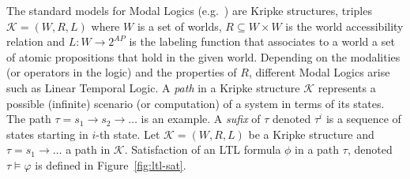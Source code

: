 \documentclass{llncs}%
\begin{document}
The standard models for Modal Logics (e.g.~\cite{goldblatt}) are Kripke structures, triples $\mathcal{K} = (W, R, L)$ where $W$ is a set of worlds, $R \subseteq W \times W$ is the world accessibility relation and $L : W \to 2^{\mathit{AP}}$ is the labeling function that associates to a world a set of atomic propositions that hold in the given world. Depending on the modalities (or operators in the logic) and the properties of $R$, different Modal Logics arise such as Linear Temporal Logic.
A \emph{path} in a Kripke structure $\mathcal{K}$ represents a possible (infinite) scenario (or computation) of a system in terms of its states. The path $\tau = s_1 \to s_2 \to \ldots$ is an example. A \emph{sufix} of $\tau$ denoted $\tau^i$ is a sequence of states starting in $i$-th state.
Let $\mathcal{K} = (W, R, L)$ be a Kripke structure and $\tau = s_1 \to \ldots$ a path in $\mathcal{K}$. Satisfaction of an LTL formula $\phi$ in a path $\tau$, denoted $\tau \models \varphi$ is defined in Figure~\ref{fig:ltl-sat}.
\end{document}
